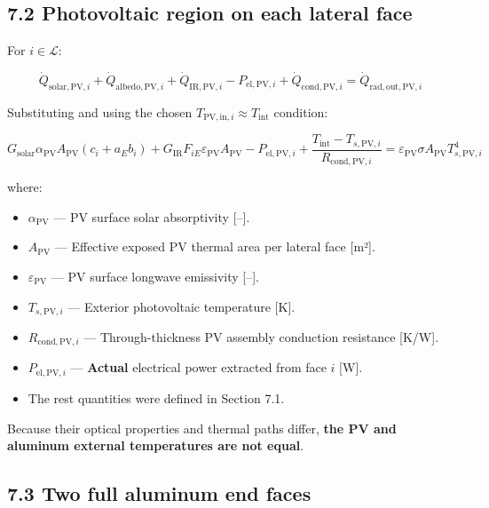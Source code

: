 \documentclass[
]{book}
\providecommand{\tightlist}{%
  \setlength{\itemsep}{0pt}\setlength{\parskip}{0pt}}
\begin{document}
\subsection{7.2 Photovoltaic region on each lateral face}\label{photovoltaic-region-on-each-lateral-face}

For \(i\in\mathcal L\):

\[
\boxed{
\dot Q_{\mathrm{solar,PV},i}
+\dot Q_{\mathrm{albedo,PV},i}
+\dot Q_{\mathrm{IR,PV},i}
-P_{\mathrm{el,PV},i}
+\dot Q_{\mathrm{cond,PV},i}
=\dot Q_{\mathrm{rad,out,PV},i}
}
\]

Substituting and using the chosen \(T_{\mathrm{PV,in},i}\approx T_{\mathrm{int}}\) condition:

\[
G_{\mathrm{solar}}\alpha_{\mathrm{PV}}A_{\mathrm{PV}}(c_i+a_Eb_i)
+
G_{\mathrm{IR}}F_{iE}\varepsilon_{\mathrm{PV}}A_{\mathrm{PV}}
-
P_{\mathrm{el,PV},i}
+
\frac{T_{\mathrm{int}}-T_{s,\mathrm{PV},i}}{R_{\mathrm{cond,PV},i}}
=
\varepsilon_{\mathrm{PV}}\sigma A_{\mathrm{PV}}T_{s,\mathrm{PV},i}^{4}
\]

where:

\begin{itemize}
\tightlist
\item
  \(\alpha_{\mathrm{PV}}\) --- PV surface solar absorptivity {[}--{]}.
\item
  \(A_{\mathrm{PV}}\) --- Effective exposed PV thermal area per lateral face {[}m²{]}.
\item
  \(\varepsilon_{\mathrm{PV}}\) --- PV surface longwave emissivity {[}--{]}.
\item
  \(T_{s,\mathrm{PV},i}\) --- Exterior photovoltaic temperature {[}K{]}.
\item
  \(R_{\mathrm{cond,PV},i}\) --- Through-thickness PV assembly conduction resistance {[}K/W{]}.
\item
  \(P_{\mathrm{el,PV},i}\) --- \textbf{Actual} electrical power extracted from face \(i\) {[}W{]}.
\item
  The rest quantities were defined in Section 7.1.
\end{itemize}

Because their optical properties and thermal paths differ, \textbf{the PV and aluminum external temperatures are not equal}.

\subsection{7.3 Two full aluminum end faces}\label{two-full-aluminum-end-faces}
\end{document}
